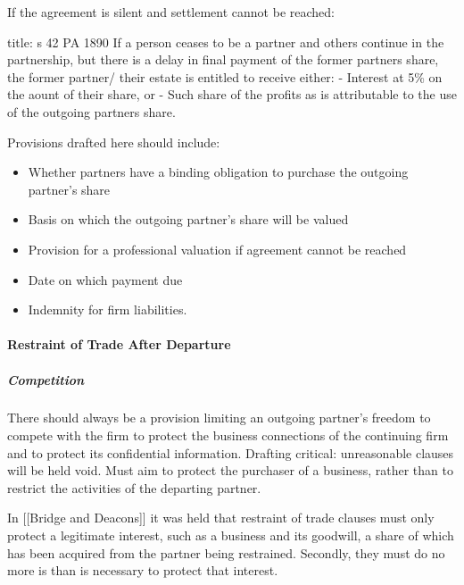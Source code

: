 \documentclass[
]{article}
\newenvironment{Shaded}{}{}
\newcommand{\NormalTok}[1]{#1}
\providecommand{\tightlist}{%
  \setlength{\itemsep}{0pt}\setlength{\parskip}{0pt}}
\begin{document}
If the agreement is silent and settlement cannot be reached:

\begin{Shaded}
\begin{Highlighting}[]
\NormalTok{title: s 42 PA 1890}
\NormalTok{If a person ceases to be a partner and others continue in the partnership, but there is a delay in final payment of the former partner\textquotesingle{}s share, the former partner/ their estate is entitled to receive either:}
\NormalTok{{-} Interest at 5\% on the aount of their share, or}
\NormalTok{{-} Such share of the profits as is attributable to the use of the outgoing partner\textquotesingle{}s share.}
\end{Highlighting}
\end{Shaded}

Provisions drafted here should include:

\begin{itemize}
\tightlist
\item
  Whether partners have a binding obligation to purchase the outgoing
  partner's share
\item
  Basis on which the outgoing partner's share will be valued
\item
  Provision for a professional valuation if agreement cannot be reached
\item
  Date on which payment due
\item
  Indemnity for firm liabilities.
\end{itemize}

\hypertarget{restraint-of-trade-after-departure}{%
\paragraph{Restraint of Trade After
Departure}\label{restraint-of-trade-after-departure}}

\hypertarget{competition}{%
\subparagraph{Competition}\label{competition}}

There should always be a provision limiting an outgoing partner's
freedom to compete with the firm to protect the business connections of
the continuing firm and to protect its confidential information.
Drafting critical: unreasonable clauses will be held void. Must aim to
protect the purchaser of a business, rather than to restrict the
activities of the departing partner.

In {[}{[}Bridge and Deacons{]}{]} it was held that restraint of trade
clauses must only protect a legitimate interest, such as a business and
its goodwill, a share of which has been acquired from the partner being
restrained. Secondly, they must do no more is than is necessary to
protect that interest.
\end{document}
